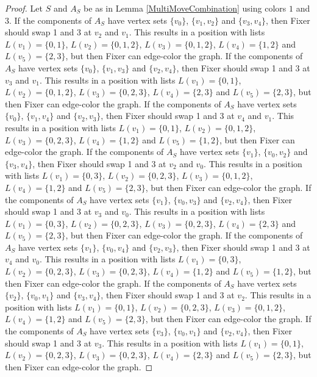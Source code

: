 \documentclass[12pt]{amsart}
\theoremstyle{plain}
\theoremstyle{definition}
\theoremstyle{remark}
\begin{document}
\begin{proof}
Let $S$ and $A_S$ be as in Lemma \ref{MultiMoveCombination} using colors $1$ and $3$. If the components of $A_S$ have vertex sets $\{v_0\}$, $\{v_1, v_2\}$ and $\{v_3, v_4\}$, then Fixer should swap 1 and 3 at $v_2$ and $v_1$. This results in a position with lists $L(v_1) = \{0, 1\}$, $L(v_2) = \{0, 1, 2\}$, $L(v_3) = \{0, 1, 2\}$, $L(v_4) = \{1, 2\}$ and $L(v_5) = \{2, 3\}$, but then Fixer can edge-color the graph.
If the components of $A_S$ have vertex sets $\{v_0\}$, $\{v_1, v_3\}$ and $\{v_2, v_4\}$, then Fixer should swap 1 and 3 at $v_3$ and $v_1$. This results in a position with lists $L(v_1) = \{0, 1\}$, $L(v_2) = \{0, 1, 2\}$, $L(v_3) = \{0, 2, 3\}$, $L(v_4) = \{2, 3\}$ and $L(v_5) = \{2, 3\}$, but then Fixer can edge-color the graph.
If the components of $A_S$ have vertex sets $\{v_0\}$, $\{v_1, v_4\}$ and $\{v_2, v_3\}$, then Fixer should swap 1 and 3 at $v_4$ and $v_1$. This results in a position with lists $L(v_1) = \{0, 1\}$, $L(v_2) = \{0, 1, 2\}$, $L(v_3) = \{0, 2, 3\}$, $L(v_4) = \{1, 2\}$ and $L(v_5) = \{1, 2\}$, but then Fixer can edge-color the graph.
If the components of $A_S$ have vertex sets $\{v_1\}$, $\{v_0, v_2\}$ and $\{v_3, v_4\}$, then Fixer should swap 1 and 3 at $v_2$ and $v_0$. This results in a position with lists $L(v_1) = \{0, 3\}$, $L(v_2) = \{0, 2, 3\}$, $L(v_3) = \{0, 1, 2\}$, $L(v_4) = \{1, 2\}$ and $L(v_5) = \{2, 3\}$, but then Fixer can edge-color the graph.
If the components of $A_S$ have vertex sets $\{v_1\}$, $\{v_0, v_3\}$ and $\{v_2, v_4\}$, then Fixer should swap 1 and 3 at $v_3$ and $v_0$. This results in a position with lists $L(v_1) = \{0, 3\}$, $L(v_2) = \{0, 2, 3\}$, $L(v_3) = \{0, 2, 3\}$, $L(v_4) = \{2, 3\}$ and $L(v_5) = \{2, 3\}$, but then Fixer can edge-color the graph.
If the components of $A_S$ have vertex sets $\{v_1\}$, $\{v_0, v_4\}$ and $\{v_2, v_3\}$, then Fixer should swap 1 and 3 at $v_4$ and $v_0$. This results in a position with lists $L(v_1) = \{0, 3\}$, $L(v_2) = \{0, 2, 3\}$, $L(v_3) = \{0, 2, 3\}$, $L(v_4) = \{1, 2\}$ and $L(v_5) = \{1, 2\}$, but then Fixer can edge-color the graph.
If the components of $A_S$ have vertex sets $\{v_2\}$, $\{v_0, v_1\}$ and $\{v_3, v_4\}$, then Fixer should swap 1 and 3 at $v_2$. This results in a position with lists $L(v_1) = \{0, 1\}$, $L(v_2) = \{0, 2, 3\}$, $L(v_3) = \{0, 1, 2\}$, $L(v_4) = \{1, 2\}$ and $L(v_5) = \{2, 3\}$, but then Fixer can edge-color the graph.
If the components of $A_S$ have vertex sets $\{v_3\}$, $\{v_0, v_1\}$ and $\{v_2, v_4\}$, then Fixer should swap 1 and 3 at $v_3$. This results in a position with lists $L(v_1) = \{0, 1\}$, $L(v_2) = \{0, 2, 3\}$, $L(v_3) = \{0, 2, 3\}$, $L(v_4) = \{2, 3\}$ and $L(v_5) = \{2, 3\}$, but then Fixer can edge-color the graph.

\end{proof}
\end{document}
